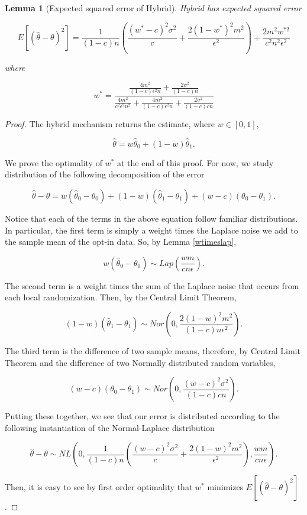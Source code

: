 \documentclass{article}
\theoremstyle{plain}
\newtheorem{lem}[thm]{Lemma}
\begin{document}
\begin{lem}[Expected squared error of Hybrid]
Hybrid has expected squared error 

$$E[(\hat{\theta} - \theta)^2] = \frac{1}{(1-c)n}\left(\frac{(w^*-c)^2\sigma^2}{c} + \frac{2(1-w^*)^2 m^2}{\epsilon^2}\right) + \frac{2m^2w^{*2}}{c^2n^2\epsilon^2}$$

where

$$w^* = \frac{\frac{4 m^2}{(1-c) \epsilon^2 n}+\frac{2 \sigma^2}{(1-c) n}}{\frac{4 m^2}{c^2 \epsilon^2 n^2}+\frac{4 m^2}{(1-c) \epsilon^2 n}+\frac{2 \sigma^2}{(1-c) c n}}$$
\end{lem}

\begin{proof}
The hybrid mechanism returns the estimate, where $w \in [0,1]$,

$$\hat{\theta} = w\hat{\theta}_0 + (1-w)\hat{\theta}_1.$$

We prove the optimality of $w^*$ at the end of this proof. For now, we study distribution of the following decomposition of the error

$$\hat{\theta} - \theta = w(\hat{\theta}_0 - \theta_0) + (1-w)(\hat{\theta}_1 - \theta_1) + (w-c)(\theta_0 - \theta_1).$$

Notice that each of the terms in the above equation follow familiar distributions. In particular, the first term is simply a weight times the Laplace noise we add to the sample mean of the opt-in data. So, by Lemma \ref{wtimeslap},

$$w(\hat{\theta}_0 - \theta_0) \sim Lap\left(\frac{wm}{cn\epsilon}\right).$$

The second term is a weight times the sum of the Laplace noise that occurs from each local randomization. Then, by the Central Limit Theorem,

$$(1-w)(\hat{\theta}_1 - \theta_1) \sim Nor\left(0, \frac{2(1-w)^2 m^2}{(1-c)n\epsilon^2}\right).$$

The third term is the difference of two sample means, therefore, by Central Limit Theorem and the difference of two Normally distributed random variables, 

$$(w-c)(\theta_0 - \theta_1) \sim Nor\left(0, \frac{(w-c)^2\sigma^2}{(1-c)cn}\right).$$

Putting these together, we see that our error is distributed according to the following instantiation of the Normal-Laplace distribution

$$\hat{\theta} - \theta \sim NL\left(0, \frac{1}{(1-c)n}\left(\frac{(w-c)^2\sigma^2}{c} + \frac{2(1-w)^2 m^2}{\epsilon^2}\right), \frac{wm}{cn\epsilon}\right).$$

Then, it is easy to see by first order optimality that $w^*$ minimizes $E[(\hat{\theta} - \theta)^2]$.
\end{proof}
\end{document}
